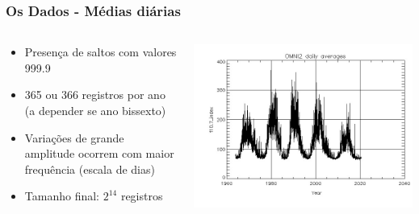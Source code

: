 \documentclass{beamer}
\begin{document}
\begin{frame}
\frametitle{Os Dados - Médias diárias}
\begin{columns}
\begin{column}{0.4\textwidth}
\begin{itemize}
\item Presença de saltos com valores 999.9
\item 365 ou 366 registros por ano (a depender se ano bissexto)
\item Variações de grande amplitude ocorrem com maior frequência (escala de dias)
\item Tamanho final: $2^{14}$ registros
\end{itemize}
\end{column}
\begin{column}{0.6\textwidth}  %
    \begin{center}
     \includegraphics[scale=0.55]{Figuras/jpg_omni2_daily_wSxReptBqw.jpg}
     \end{center}
\end{column}
\end{columns}
\end{frame}
\end{document}
